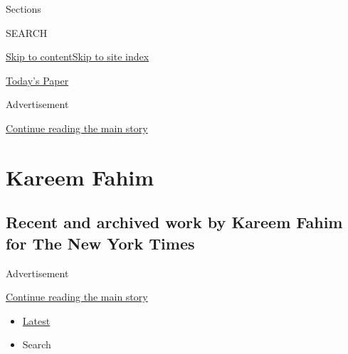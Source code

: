 Sections

SEARCH

\protect\hyperlink{site-content}{Skip to
content}\protect\hyperlink{site-index}{Skip to site index}

\href{https://myaccount.nytimes3xbfgragh.onion/auth/login?response_type=cookie\&client_id=vi}{}

\href{https://www.nytimes3xbfgragh.onion/section/todayspaper}{Today's
Paper}

Advertisement

\protect\hyperlink{after-top}{Continue reading the main story}

\hypertarget{kareem-fahim}{%
\section{Kareem Fahim}\label{kareem-fahim}}

\hypertarget{recent-and-archived-work-by-kareem-fahim-for-the-new-york-times}{%
\subsection{Recent and archived work by Kareem Fahim for The New York
Times}\label{recent-and-archived-work-by-kareem-fahim-for-the-new-york-times}}

Advertisement

\protect\hyperlink{after-mid1}{Continue reading the main story}

\begin{itemize}
\tightlist
\item
  \protect\hyperlink{stream-panel}{Latest}
\item
  Search
\end{itemize}

